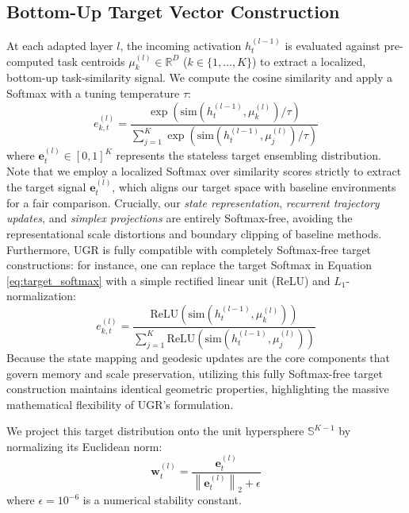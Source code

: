 \subsection{Bottom-Up Target Vector Construction}
At each adapted layer $l$, the incoming activation $h_t^{(l-1)}$ is evaluated against pre-computed task centroids $\mu_k^{(l)} \in \mathbb{R}^D$ ($k \in \{1, \dots, K\}$) to extract a localized, bottom-up task-similarity signal. We compute the cosine similarity and apply a Softmax with a tuning temperature $\tau$:
\begin{equation}
e_{k, t}^{(l)} = \frac{\exp\left( \text{sim}(h_t^{(l-1)}, \mu_k^{(l)}) / \tau \right)}{\sum_{j=1}^K \exp\left( \text{sim}(h_t^{(l-1)}, \mu_j^{(l)}) / \tau \right)}
\label{eq:target_softmax}
\end{equation}
where $\mathbf{e}_t^{(l)} \in [0, 1]^K$ represents the stateless target ensembling distribution. Note that we employ a localized Softmax over similarity scores strictly to extract the target signal $\mathbf{e}_t^{(l)}$, which aligns our target space with baseline environments for a fair comparison. Crucially, our \emph{state representation}, \emph{recurrent trajectory updates}, and \emph{simplex projections} are entirely Softmax-free, avoiding the representational scale distortions and boundary clipping of baseline methods. Furthermore, UGR is fully compatible with completely Softmax-free target constructions: for instance, one can replace the target Softmax in Equation \eqref{eq:target_softmax} with a simple rectified linear unit (ReLU) and $L_1$-normalization:
\begin{equation}
e_{k, t}^{(l)} = \frac{\text{ReLU}\left( \text{sim}(h_t^{(l-1)}, \mu_k^{(l)}) \right)}{\sum_{j=1}^K \text{ReLU}\left( \text{sim}(h_t^{(l-1)}, \mu_j^{(l)}) \right)}
\label{eq:target_relu}
\end{equation}
Because the state mapping and geodesic updates are the core components that govern memory and scale preservation, utilizing this fully Softmax-free target construction maintains identical geometric properties, highlighting the massive mathematical flexibility of UGR's formulation.

We project this target distribution onto the unit hypersphere $\mathbb{S}^{K-1}$ by normalizing its Euclidean norm:
\begin{equation}
\mathbf{w}_t^{(l)} = \frac{\mathbf{e}_t^{(l)}}{\left\|\mathbf{e}_t^{(l)}\right\|_2 + \epsilon}
\label{eq:target_l2_norm}
\end{equation}
where $\epsilon = 10^{-6}$ is a numerical stability constant.

